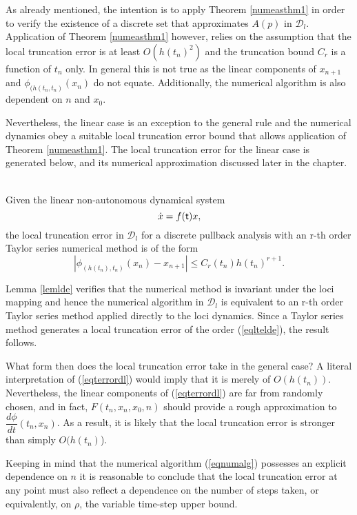 As already mentioned, the intention is to apply Theorem \ref{numeasthm1} in
order to verify the existence of a discrete set that approximates $A(p)$ in
$\mathcal{D}_l$. Application of Theorem \ref{numeasthm1} however, relies on the
assumption that the local truncation error is at least $O(h(t_n)^2)$ and the
truncation bound $C_r$ is a function of $t_n$ only. In general this is not true
as the linear components of $x_{n+1}$ and $\phi_{(h(t_n, t_n)}(x_n)$ do not
equate. Additionally, the numerical algorithm is also dependent on $n$ and
$x_0$.

Nevertheless, the linear case is an exception to the
general rule and the numerical dynamics obey a suitable local truncation error bound that allows application of Theorem \ref{numeasthm1}. The local truncation error for the
linear case is generated below, and its numerical approximation discussed later
in the chapter.

\begin{lemma}\label{lemldete}
\hfill \\
Given the linear non-autonomous dynamical system
\[ \dot{x} = f( \mathsf{\mathsf{t}})x, \]
the local truncation error in $\mathcal{D}_l$ for a discrete pullback analysis
with an r-th order Taylor series numerical method
is of the form
\begin{equation} \label{eqltelde}
  |\phi_{(h(t_n), t_n)}(x_n) - x_{n+1}| \leq C_r(t_n) h(t_n)^{r+1}.
\end{equation}
\end{lemma}
\begin{prf}
Lemma \ref{lemlde} verifies that the numerical method is invariant under the
loci mapping and hence the numerical algorithm in $\mathcal{D}_l$ is equivalent
to an r-th order Taylor series method applied directly to the loci dynamics.
Since a Taylor series method generates a local truncation error of the order
(\ref{eqltelde}), the result follows.
\end{prf}

What form then does the local truncation error take in the general case? A
literal interpretation of (\ref{eqterrordl}) would imply that it is merely of
$O(h(t_n))$. Nevertheless, the linear components of (\ref{eqterrordl}) are far
from randomly chosen, and in fact, $F(t_n, x_n, x_0, n)$ should provide a rough
approximation to $\dfrac{d\phi}{dt} (t_n, x_n)$.  As a result, it is likely that
the local truncation error is stronger than simply $O(h(t_n)$).

Keeping in mind that the numerical algorithm (\ref{eqnumalg}) possesses an
explicit dependence on $n$ it is reasonable to conclude that
the local truncation error at any point must also reflect a dependence on the
number of steps taken, or equivalently, on $\rho$, the variable time-step upper
bound.


